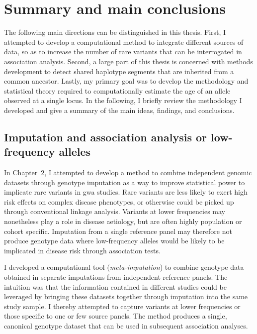 \section{Summary and main conclusions}


The following main directions can be distinguished in this thesis.
First, I attempted to develop a computational method to integrate different sources of data, so as to increase the number of rare variants that can be interrogated in association analysis.
Second, a large part of this thesis is concerned with methods development to detect shared haplotype segments that are inherited from a common ancestor.
Lastly, my primary goal was to develop the methodology and statistical theory required to computationally estimate the age of an allele observed at a single locus.
In the following, I briefly review the methodology I developed and give a summary of the main ideas, findings, and conclusions.


\subsection{Imputation and association analysis or low-frequency alleles}

In Chapter~2, I attempted to develop a method to combine independent genomic datasets through genotype imputation as a way to improve statistical power to implicate rare variants in \gls{gwa} studies.
Rare variants are less likely to exert high risk effects on complex disease phenotypes, or otherwise could be picked up through conventional linkage analysis.
Variants at lower frequencies may nonetheless play a role in disease aetiology, but are often  highly population or cohort specific.
Imputation from a single reference panel may therefore not produce genotype data where low-frequency alleles would be likely to be implicated in disease risk through association tests.

I developed a computational tool (\emph{meta-imputation}) to combine genotype data obtained in separate imputations from independent reference panels.
The intuition was that the information contained in different studies could be leveraged by bringing these datasets together through imputation into the same study sample.
I thereby attempted to capture variants at lower frequencies or those specific to one or few source panels.
The method produces a single, canonical genotype dataset that can be used in subsequent association analyses.

